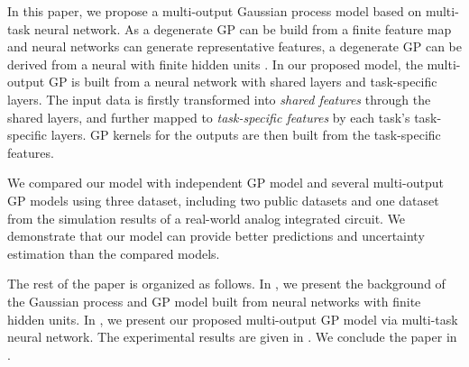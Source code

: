 In this paper, we propose a multi-output Gaussian process model based on multi-task neural network. As a degenerate GP can be build from a finite feature map and neural networks can generate representative features, a degenerate GP can be derived from a neural with finite hidden units \cite{lazaro2010marginalized, huang2015scalable}. In our proposed model, the multi-output GP is built from a neural network with shared layers and task-specific layers. The input data is firstly transformed into \emph{shared features} through the shared layers, and further mapped to \emph{task-specific features} by each task's task-specific layers. GP kernels for the outputs are then built from the task-specific features.

We compared our model with independent GP model and several multi-output GP models using three dataset, including two public datasets and one dataset from the simulation results of a real-world analog integrated circuit. We demonstrate that our model can provide better predictions and uncertainty estimation than the compared models.

The rest of the paper is organized as follows. In , we present the background of the Gaussian process and GP model built from neural networks with finite hidden units. In , we present our proposed multi-output GP model via multi-task neural network. The experimental results are given in . We conclude the paper in .

